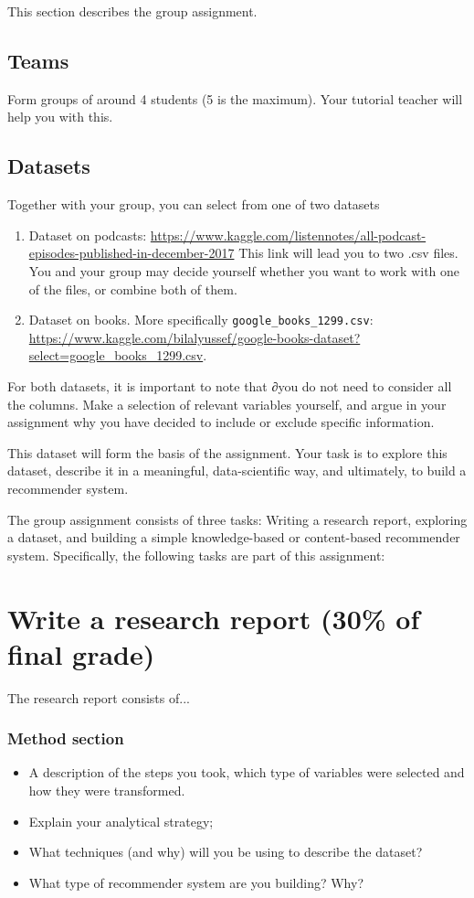 This section describes the group assignment. 

\subsection*{Teams}


Form groups of around 4 students (5 is the maximum). Your tutorial teacher will help you with this.

\subsection*{Datasets}
Together with your group, you can select from one of two datasets
\begin{enumerate}
	\item Dataset on podcasts:  \url{https://www.kaggle.com/listennotes/all-podcast-episodes-published-in-december-2017}
	This link will lead you to two .csv files. You and your group may decide yourself whether you want to work with one of the files, or combine both of them.
	\item Dataset on books. More specifically \texttt{google\_books\_1299.csv}: \url{https://www.kaggle.com/bilalyussef/google-books-dataset?select=google_books_1299.csv}. 
\end{enumerate}

For both datasets, it is important to note that ∂you do not need to consider all the columns. Make a selection of relevant variables yourself, and argue in your assignment why you have decided to include or exclude specific information. 

This dataset will form the basis of the assignment. Your task is to explore this dataset, describe it in a meaningful, data-scientific way, and ultimately, to build a recommender system.

The group assignment consists of three tasks: Writing a research report, exploring a dataset, and building a simple knowledge-based or content-based recommender system. Specifically, the following tasks are part of this assignment:

\section{Write a research report (30\% of final grade)}

The research report consists of...

\subsubsection{Method section}
\begin{itemize}
	\item A description of the steps you took, which type of variables were selected and how they were transformed.
	\item Explain your analytical strategy;
	\item What techniques (and why) will you be using to describe the dataset?
	\item What type of recommender system are you building? Why?  
\end{itemize}

